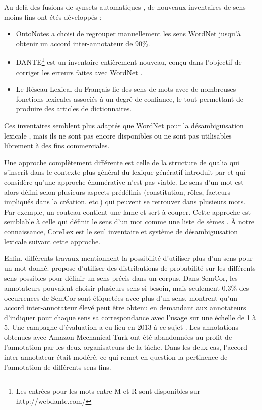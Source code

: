 Au-delà des fusions de synsets automatiques \citep{snow2007learning}, de
nouveaux inventaires de sens moins fins ont étés développés :

\begin{itemize}

    \item OntoNotes \citep{hovy2006ontonotes} a choisi de regrouper
        manuellement les sens WordNet jusqu'à obtenir un accord
        inter-annotateur de 90\%.

    \item DANTE\footnote{Les entrées pour les mots entre M et R sont
        disponibles sur http://webdante.com/} \citep{mccarthy2010dante} est un
        inventaire entièrement nouveau, conçu dans l'objectif de corriger les
        erreurs faites avec WordNet \citep{kilgarriff2010detailed}.

    \item Le Réseau Lexical du Français \citep{gader2014lexicon} lie des sens de
        mots avec de nombreuses fonctions lexicales associés à un degré de
        confiance, le tout permettant de produire des articles de dictionnaires.

\end{itemize}

Ces inventaires semblent plus adaptés que WordNet pour la désambiguïsation
lexicale \citep{navigli2012quick}, mais ils ne sont pas encore disponibles ou
ne sont pas utilisables librement à des fins commerciales.

Une approche complètement différente est celle de la structure de qualia
\citep{johnston1996qualia} qui s'inscrit dans le contexte plus général du
lexique génératif introduit par \cite{pustejovsky1991generative} et qui
considère qu'une approche énumérative n'est pas viable. Le sens d'un mot est
alors défini selon plusieurs aspects prédéfinis (constitution, rôles, facteurs
impliqués dans la création, etc.) qui peuvent se retrouver dans plusieurs mots.
Par exemple, un couteau contient une lame et sert à couper. Cette approche est
semblable à celle qui définit le sens d'un mot comme une liste de sèmes
\citep{rastier1987semantique}. À notre connaissance, CoreLex
\citep{buitelaar1998corelex} est le seul inventaire et système de
désambiguïsation lexicale suivant cette approche.

Enfin, différents travaux mentionnent la possibilité d'utiliser plus d'un sens
pour un mot donné. \cite{smith2011rumble} propose d'utiliser des distributions
de probabilité sur les différents sens possibles pour définir un sens précis
dans un corpus. Dans SemCor, les annotateurs pouvaient choisir plusieurs sens
si besoin, mais seulement 0.3\% des occurrences de SemCor sont étiquetées avec
plus d'un sens. \cite{erk2013measuring} montrent qu'un accord inter-annotateur
élevé peut être obtenu en demandant aux annotateurs d'indiquer pour chaque sens
sa correspondance avec l'usage sur une échelle de 1 à 5. Une campagne
d'évaluation a eu lieu en 2013 à ce sujet \citep{jurgens2013semeval}. Les
annotations obtenues avec Amazon Mechanical Turk ont été abandonnées au profit
de l'annotation par les deux organisateurs de la tâche. Dans les deux cas,
l'accord inter-annotateur était modéré, ce qui remet en question la pertinence
de l'annotation de différents sens fins.

